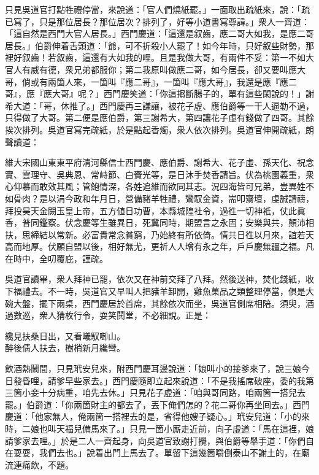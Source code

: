 只見吳道官打點牲禮停當，來說道：「官人們燒紙罷。」一面取出疏紙來，說：「疏已寫了，只是那位居長？那位居次？排列了，好等小道書寫尊諱。」衆人一齊道：「這自然是西門大官人居長。」{}西門慶道：「這還是叙齒，應二哥大如我，是應二哥居長。」伯爵伸着舌頭道：「爺，可不折殺小人罷了！{}如今年時，只好叙些財勢，那裡好叙齒！{}若叙齒，這還有大如我的哩。且是我做大哥，有兩件不妥：第一不如大官人有威有德，{}衆兄弟都服你；第二我原叫做應二哥，如今居長，卻又要叫應大哥，倘或有兩箇人來，一箇叫『應二哥』，一箇叫『應大哥』，我還是應『應二哥』，應『應大哥』呢？」西門慶笑道：「你這搊斷腸子的，單有這些閑說的！」謝希大道：「哥，休推了。」西門慶再三謙讓，被花子虛、應伯爵等一干人逼勒不過，只得做了大哥。第二便是應伯爵，第三謝希大，第四讓花子虛有錢做了四哥。其餘挨次排列。吳道官寫完疏紙，於是點起香燭，衆人依次排列。吳道官伸開疏紙，朗聲讀道：

\begin{myquote}[\markfont]
維大宋國山東東平府清河縣信士西門慶、應伯爵、謝希大、花子虛、孫天化、祝念實、雲理守、吳典恩、常峙節、白賚光等，是日沐手焚香請旨。伏為桃園義重，衆心仰慕而敢效其風；管鮑情深，各姓追維而欲同其志。況四海皆可兄弟，豈異姓不如骨肉？是以涓今政和年月日，營備豬羊牲禮，鸞馭金資，耑叩齋壇，虔誠請禱，拜投昊天金闕玉皇上帝，五方値日功曹，本縣城隍社令，過徃一切神衹，仗此眞香，普同鑑察。伏念慶等生雖異日，死冀同時，期盟言之永固；安樂與共，顛沛相扶，思締結以常新。必富貴常念貧窮，乃始終有所依倚。情共日徃以月來，誼若天高而地厚。伏願自盟以後，相好無尤，更祈人人增有永之年，戶戶慶無疆之福。凡在時中，全叨覆庇，謹疏。

\end{myquote}

吳道官讀畢，衆人拜神已罷，依次又在神前交拜了八拜。然後送神，焚化錢紙，收下福禮去。不一時，吳道官又早叫人把豬羊卸開，雞魚菓品之類整理停當，俱是大碗大盤，擺下兩桌，西門慶居於首席，其餘依次而坐，吳道官側席相陪。須臾，酒過數巡，衆人猜枚行令，耍笑鬨堂，不必細說。正是：

\begin{myquote}
纔見扶桑日出，又看曦馭啣山。\\
醉後倩人扶去，樹梢新月纔彎。
\end{myquote}

飲酒熱鬧間，只見玳安兒來，附西門慶耳邊說道：「娘叫小的接爹來了，說三娘今日發昏哩，請爹早些家去。」西門慶隨即立起來說道：「不是我搖席破座，委的我第三箇小妾十分病重，咱先去休。」只見花子虛道：「咱與哥同路，咱兩箇一搭兒去罷。」伯爵道：「你兩箇財主的都去了，{}丟下俺們怎的？花二哥你再坐囘去。」西門慶道：「他家無人，俺兩箇一搭裡去的是，省得他嫂子疑心。」玳安兒道：「小的來時，二娘也叫天福兒備馬來了。」只見一箇小厮走近前，向子虛道：「馬在這裡，娘請爹家去哩。」於是二人一齊起身，向吳道官致謝打攪，與伯爵等舉手道：「你們自在耍耍，我們去也。」說着出門上馬去了。單留下這幾箇嚼倒泰山不謝土的，在廟流連痛飲，不題。

